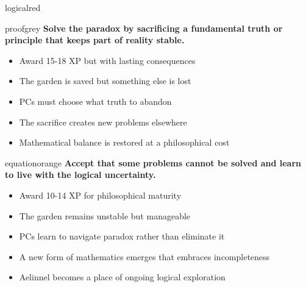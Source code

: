 \documentclass[11pt]{article}
\begin{document}
\begin{campaignsection}{logicalred}
\begin{clockbox}{proofgrey}
\textbf{Solve the paradox by sacrificing a fundamental truth or principle that keeps part of reality stable.}
\begin{itemize}
    \item Award 15-18 XP but with lasting consequences
    \item The garden is saved but something else is lost
    \item PCs must choose what truth to abandon
    \item The sacrifice creates new problems elsewhere
    \item Mathematical balance is restored at a philosophical cost
\end{itemize}
\end{clockbox}

\begin{clockbox}{equationorange}
\textbf{Accept that some problems cannot be solved and learn to live with the logical uncertainty.}
\begin{itemize}
    \item Award 10-14 XP for philosophical maturity
    \item The garden remains unstable but manageable
    \item PCs learn to navigate paradox rather than eliminate it
    \item A new form of mathematics emerges that embraces incompleteness
    \item Aelinnel becomes a place of ongoing logical exploration
\end{itemize}
\end{clockbox}
\end{campaignsection}

\newpage
\end{document}
